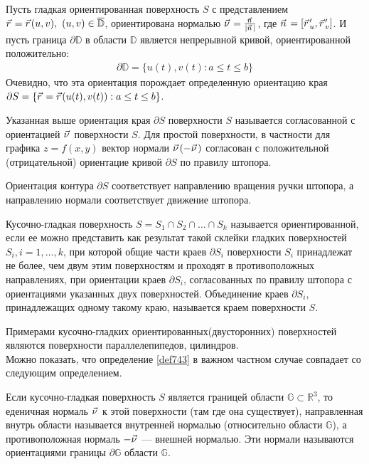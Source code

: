 Пусть гладкая ориентированная поверхность $S$ с представлением $\pvec r = \pvec
r(u, v), \ (u, v) \in \overline{\mathbb{D}}$, ориентирована нормалью $\pvec \nu
= \frac{\pvec n}{|\pvec n|}$, где $\pvec n = [\pvec r_u', \pvec r_v']$. И пусть
граница $\partial \mathbb{D}$ в области $\mathbb{D}$ является непрерывной
кривой, ориентированной положительно:
\begin{gather*}
  \partial \mathbb{D} = \{u(t), v(t) : a \leq t \leq b\}
\end{gather*}
Очевидно, что эта ориентация порождает определенную ориентацию края $\partial
S = \{\pvec r = \pvec r(u(t), v(t)) : a \leq t \leq b\}$.

\begin{definition}
  Указанная выше ориентация края $\partial S$ поверхности $S$ называется
  согласованной с ориентацией $\pvec \nu$ поверхности $S$. Для простой
  поверхности, в частности для графика $z = f(x, y)$ вектор нормали $\pvec
  \nu (-\pvec \nu)$ согласован с положительной (отрицательной) ориентацие
  кривой $\partial S$ по правилу штопора.
\end{definition}
Ориентация контура $\partial S$ соответствует направлению вращения ручки
штопора, а направлению нормали соответствует движение штопора.

\begin{definition}
  \label{def743}
  Кусочно-гладкая поверхность $S = S_1 \cap S_2 \cap \dots \cap S_k$ называется
  ориентированной, если ее можно представить как результат такой склейки
  гладких поверхностей $S_i, i = 1, \dots, k$, при которой общие части краев
  $\partial S_i$ поверхности $S_i$ принадлежат не более, чем двум этим
  поверхностям и проходят в противоположных направлениях, при ориентации краев
  $\partial S_i$, согласованных по правилу штопора с ориентациями указанных
  двух поверхностей. Объединение краев $\partial S_i$, принадлежащих одному
  такому краю, называется краем поверхности $S$.
\end{definition}

Примерами кусочно-гладких ориентированных(двусторонних) поверхностей являются
поверхности параллелепипедов, цилиндров. \\
Можно показать, что определение \eqref{def743} в важном частном случае
совпадает со следующим определением.

\begin{definition}
  Если кусочно-гладкая поверхность $S$ является границей области $\mathbb{G}
  \subset \mathbb{R}^3$, то еденичная нормаль $\pvec \nu$ к этой поверхности
  (там где она существует), направленная внутрь области называется внутренней
  нормалью (относительно области $\mathbb{G}$), а противоположная нормаль
  $-\pvec \nu$ --- внешней нормалью. Эти нормали называются ориентациями
  границы $\partial \mathbb{G}$ области $\mathbb{G}$.
\end{definition}

